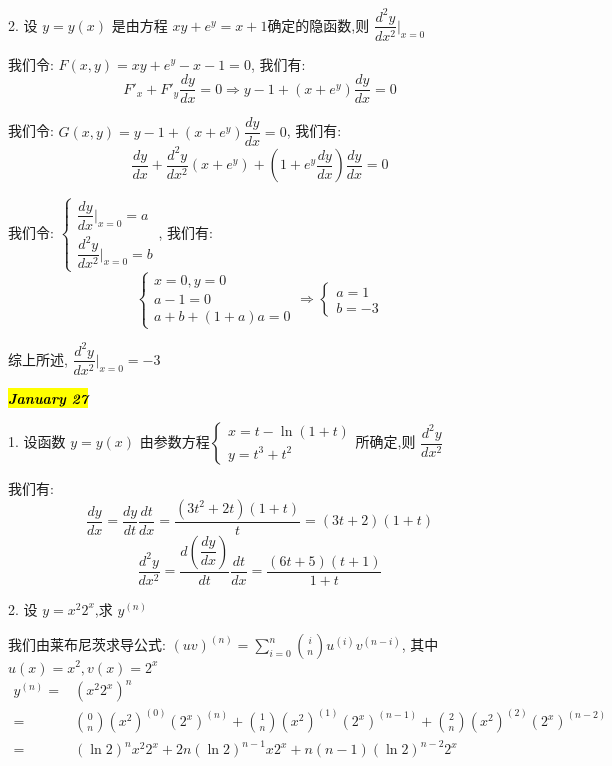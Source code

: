 2. 设 $y=y(x)$ 是由方程 $xy+e^{y}=x+1$确定的隐函数,则 $\dfrac{d^{2}y}{dx^{2}}\big|_{x=0}$
\begin{solution}

	我们令: $F(x,y) = xy+e^{y}-x-1 = 0$, 我们有:
	$$F'_{x} +F'_{y}\dfrac{dy}{dx} = 0\Rightarrow y-1+(x+e^{y})\dfrac{dy}{dx} = 0$$

	我们令: $G(x,y) = y-1+(x+e^{y})\dfrac{dy}{dx} = 0$, 我们有:
	$$\dfrac{dy}{dx}+\dfrac{d^{2}y}{dx^{2}}(x+e^{y})+ (1+e^{y}\dfrac{dy}{dx})\dfrac{dy}{dx}= 0$$

	我们令: $\begin{cases} \dfrac{dy}{dx}\big|_{x=0} =a\\\dfrac{d^{2}y}{dx^{2}}\big|_{x=0} =b \end{cases}$, 我们有:
	$$\begin{cases}
		x = 0,y = 0\\
		a - 1 = 0\\
		a + b + (1+a)a = 0
	\end{cases}\Rightarrow \begin{cases} a = 1\\b = -3\end{cases}$$

	综上所述, $\dfrac{d^{2}y}{dx^{2}}\big|_{x=0} = -3$
\end{solution}

\hl{\textbf{\textit{January 27}}}

1. 设函数 $y=y(x)$ 由参数方程$\begin{cases}
	x=t-\ln(1+t)\\y=t^{3}+t^{2}
\end{cases}$所确定,则 $\dfrac{d^{2}y}{dx^{2}}$
\begin{solution}

	我们有:
	$$\dfrac{dy}{dx} = \dfrac{dy}{dt}\dfrac{dt}{dx} = \dfrac{(3t^{2}+2t)(1+t)}{t} = (3t+2)(1+t)$$
	$$\dfrac{d^{2}y}{dx^{2}} = \dfrac{d(\dfrac{dy}{dx})}{dt}\dfrac{dt}{dx}=\dfrac{(6t+5)(t+1)}{1+t}$$
\end{solution}

2. 设 $y=x^{2}2^{x}$,求 $y^{(n)}$
\begin{solution}

	我们由莱布尼茨求导公式: $(uv)^{(n)} = \sum\limits_{i = 0}^{n}\binom{i}{n}u^{(i)}v^{(n-i)}$, 其中 $u(x) = x^{2}, v(x) = 2^{x}$
	\begin{align*}
		y^{(n)} = & (x^{2}2^{x})^{n}\\
		        = & \binom{0}{n}(x^{2})^{(0)}(2^{x})^{(n)}+\binom{1}{n}(x^{2})^{(1)}(2^{x})^{(n-1)}+\binom{2}{n}(x^{2})^{(2)}(2^{x})^{(n-2)}\\
				= & (\ln 2)^{n}x^{2}2^{x} + 2n(\ln 2)^{n-1}x2^{x}+n(n-1)(\ln 2)^{n-2}2^{x}
	\end{align*}
\end{solution}

